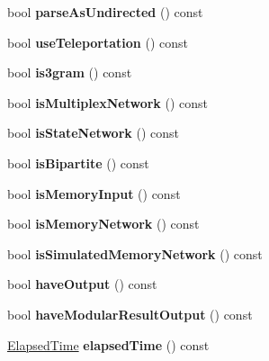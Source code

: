 \begin{DoxyCompactItemize}
\mbox{\label{structConfig_aef7690b5ba5803f8561f4809c5e1b3a4}} 
bool {\bfseries parse\+As\+Undirected} () const
\item 
\mbox{\label{structConfig_a505a361a0afa9bb369bd377346801fe2}} 
bool {\bfseries use\+Teleportation} () const
\item 
\mbox{\label{structConfig_aa9b2644dcae6eb96a411e16e84349e62}} 
bool {\bfseries is3gram} () const
\item 
\mbox{\label{structConfig_a21183b14885e7d0cfcd376857d06d98f}} 
bool {\bfseries is\+Multiplex\+Network} () const
\item 
\mbox{\label{structConfig_a09191634d0a65c1356b4aadf11c3ff3a}} 
bool {\bfseries is\+State\+Network} () const
\item 
\mbox{\label{structConfig_a1f48e3d591db94b47fc1c20be9e9963f}} 
bool {\bfseries is\+Bipartite} () const
\item 
\mbox{\label{structConfig_ad799e85722f5aa378a5240e56f81a8d8}} 
bool {\bfseries is\+Memory\+Input} () const
\item 
\mbox{\label{structConfig_a8753f2bec03f6790abbc4ff9c1d9ff90}} 
bool {\bfseries is\+Memory\+Network} () const
\item 
\mbox{\label{structConfig_a996161d5316873b40b64e875b8f01aae}} 
bool {\bfseries is\+Simulated\+Memory\+Network} () const
\item 
\mbox{\label{structConfig_ad1cf0547dd5c6bbf9ca08d9b3eefe0ba}} 
bool {\bfseries have\+Output} () const
\item 
\mbox{\label{structConfig_a636dc5d621e0fcee1d893db7f650b705}} 
bool {\bfseries have\+Modular\+Result\+Output} () const
\item 
\mbox{\label{structConfig_ab573ca84bccb136fcb92dfc3d2344175}} 
\mbox{\hyperlink{classElapsedTime}{Elapsed\+Time}} {\bfseries elapsed\+Time} () const
\end{DoxyCompactItemize}

